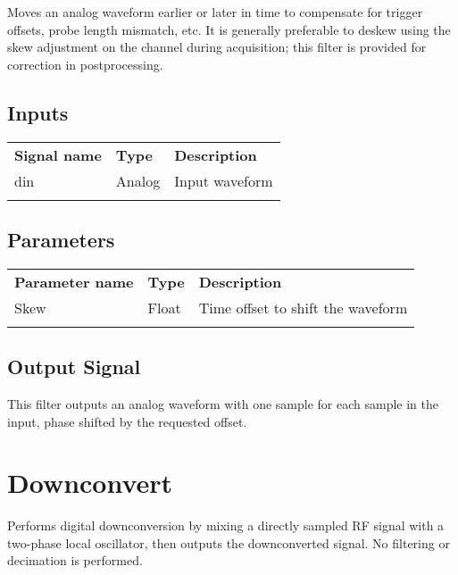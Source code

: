 Moves an analog waveform earlier or later in time to compensate for trigger offsets, probe length mismatch, etc.
It is generally preferable to deskew using the skew adjustment on the channel during acquisition; this filter is
provided for correction in postprocessing.

\subsection{Inputs}

\begin{tabularx}{16cm}{llX}
\thickhline
\textbf{Signal name} & \textbf{Type} & \textbf{Description} \\
\thickhline
din & Analog & Input waveform \\
\thickhline
\end{tabularx}

\subsection{Parameters}

\begin{tabularx}{16cm}{llX}
\thickhline
\textbf{Parameter name} & \textbf{Type} & \textbf{Description} \\
\thickhline
Skew & Float & Time offset to shift the waveform\\
\thickhline
\end{tabularx}

\subsection{Output Signal}

This filter outputs an analog waveform with one sample for each sample in the input, phase shifted by the requested
offset.

\pagebreak
\section{Downconvert}

Performs digital downconversion by mixing a directly sampled RF signal with a two-phase local oscillator, then outputs
the downconverted signal. No filtering or decimation is performed.

\pagebreak
